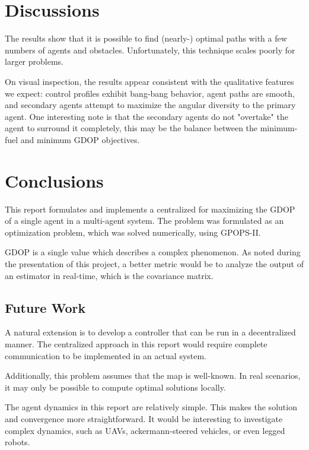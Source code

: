 \documentclass[conference]{IEEEtran}
\begin{document}

\section{Discussions}
The results show that it is possible to find (nearly-) optimal paths with a few numbers of agents and obstacles. Unfortunately, this technique scales poorly for larger problems.

On visual inspection, the results appear consistent with the qualitative features we expect: control profiles exhibit bang-bang behavior, agent paths are smooth, and secondary agents attempt to maximize the angular diversity to the primary agent. One interesting note is that the secondary agents do not "overtake" the agent to surround it completely, this may be the balance between the minimum-fuel and minimum GDOP objectives.

\section{Conclusions}
This report formulates and implements a centralized for maximizing the GDOP of a single agent in a multi-agent system. The problem was formulated as an optimization problem, which was solved numerically, using GPOPS-II.

GDOP is a single value which describes a complex phenomenon. As noted during the presentation of this project, a better metric would be to analyze the output of an estimator in real-time, which is the covariance matrix.

\subsection{Future Work}
A natural extension is to develop a controller that can be run in a decentralized manner. The centralized approach in this report would require complete communication to be implemented in an actual system.

Additionally, this problem assumes that the map is well-known. In real scenarios, it may only be possible to compute optimal solutions locally.

The agent dynamics in this report are relatively simple. This makes the solution and convergence more straightforward. It would be interesting to investigate complex dynamics, such as UAVs, ackermann-steered vehicles, or even legged robots.
\end{document}
